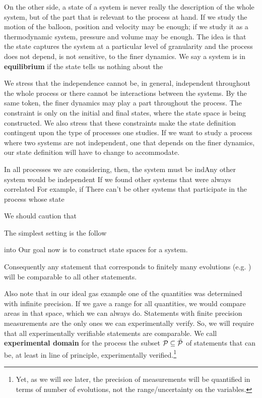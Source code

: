 \documentclass[letterpaper]{article}
\begin{document}
On the other side, a state of a system is never really the description of the whole system, but of the part that is relevant to the process at hand. If we study the motion of the balloon, position and velocity may be enough; if we study it as a thermodynamic system, pressure and volume may be enough. The idea is that the state captures the system at a particular level of granularity and the process does not depend, is not sensitive, to the finer dynamics. We say a system is in \textbf{equilibrium} if the state tells us nothing about the 

We stress that the independence cannot be, in general, independent throughout the whole process or there cannot be interactions between the systems. By the same token, the finer dynamics may play a part throughout the process. The constraint is only on the initial and final states, where the state space is being constructed. We also stress that these constraints make the state definition contingent upon the type of processes one studies. If we want to study a process where two systems are not independent, one that depends on the finer dynamics, our state definition will have to change to accommodate.






 In all processes we are considering, then, the system must be indAny other system would be independent If we found other systems that were always correlated For example, if  There can't be other systems that participate in the process whose state 



We should caution that 

The simplest setting is the follow

 into Our goal now is to construct state spaces for a system.


 Consequently any statement that corresponds to finitely many evolutions (e.g. ) will be comparable to all other statements.

Also note that in our ideal gas example one of the quantities was determined with infinite precision. If we gave a range for all quantities, we would compare areas in that space, which we can always do. Statements with finite precision measurements are the only ones we can experimentally verify. So, we will require that all experimentally verifiable statements are comparable. We call \textbf{experimental domain} for the process the subset $\edomain[P] \subseteq \tdomain[P]$ of statements that can be, at least in line of principle, experimentally verified.\footnote{Yet, as we will see later, the precision of measurements will be quantified in terms of number of evolutions, not the range/uncertainty on the variables.}
\end{document}
